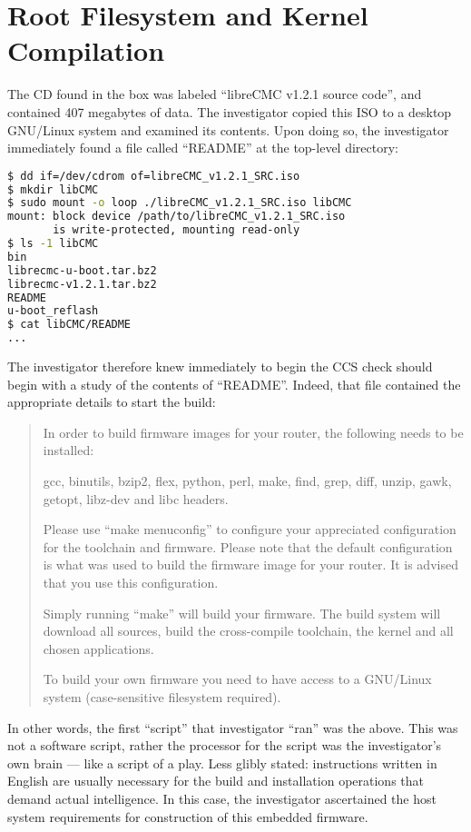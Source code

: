 \section{Root Filesystem and Kernel Compilation}

The CD found in the box was labeled ``libreCMC v1.2.1 source code'', and
contained 407 megabytes of data.  The investigator copied this ISO to a
desktop GNU/Linux system and
examined its contents.  Upon doing so, the investigator immediately found a
file called ``README'' at the top-level directory:

\lstset{tabsize=2}
\begin{lstlisting}[language=bash]
$ dd if=/dev/cdrom of=libreCMC_v1.2.1_SRC.iso
$ mkdir libCMC
$ sudo mount -o loop ./libreCMC_v1.2.1_SRC.iso libCMC
mount: block device /path/to/libreCMC_v1.2.1_SRC.iso
       is write-protected, mounting read-only
$ ls -1 libCMC
bin
librecmc-u-boot.tar.bz2
librecmc-v1.2.1.tar.bz2
README
u-boot_reflash
$ cat libCMC/README
...
\end{lstlisting}
\label{thinkpenguin-toplevel-readme}
The investigator therefore knew immediately to begin the CCS check should
begin with a study of the contents of ``README''.  Indeed, that file contained the appropriate
details to start the build:
\begin{quotation}

In order to build firmware images for your router, the following needs to be
installed:

gcc, binutils, bzip2, flex, python, perl, make, find, grep, diff, unzip,
gawk, getopt, libz-dev and libc headers.

Please use ``make menuconfig'' to configure your appreciated configuration
for the toolchain and firmware. Please note that the default configuration is
what was used to build the firmware image for your router. It is advised that
you use this configuration.

Simply running ``make'' will build your firmware.  The build system will
download all sources, build the cross-compile toolchain, the kernel and all
chosen applications.

To build your own firmware you need to have access to a GNU/Linux system
(case-sensitive filesystem required).
\end{quotation}

In other words, the first ``script'' that investigator ``ran'' was the above.
This was not a software script, rather the processor for the script was the investigator's own
brain --- like a script of a play.  Less glibly stated: instructions written in
English are usually necessary for the build and installation operations
that demand actual intelligence.
In this case, the investigator ascertained the host system requirements
for construction of this embedded firmware.

